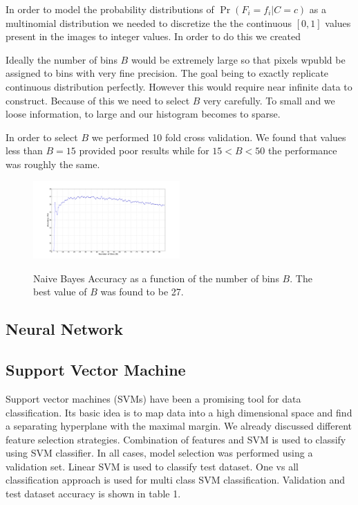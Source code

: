 \documentclass[10pt,twocolumn]{article}
\begin{document}
In order to model the probability distributions of $\Pr(F_i = f_i | C = c)$ as a multinomial distribution we needed to discretize the the continuous $[0,1]$ values present in the images to integer values. In order to do this we created

Ideally the number of bins $B$ would be extremely large so that pixels wpubld be assigned to bins with very fine precision. The goal being to exactly replicate continuous distribution perfectly. However this would require near infinite data to construct. Because of this we need to select $B$ very carefully. To small and we loose information, to large and our histogram becomes to sparse. 

In order to select $B$ we performed 10 fold cross validation. We found that values less than $B=15$ provided poor results while for $ 15 < B < 50$ the performance was roughly the same.
\begin{figure}
\includegraphics[trim=150 50 150 50,clip=true,width=0.5\textwidth]{./figure_1.png}
\label{bins}
\caption{Naive Bayes Accuracy as a function of the number of bins $B$. The best value of $B$ was found to be 27.}
\end{figure}
\subsection{Neural Network}
\subsection{Support Vector Machine}
Support vector machines (SVMs) have been a promising tool for data classification. Its basic idea is to map data into a high dimensional space and find a separating hyperplane with the maximal margin.
We already discussed different feature selection strategies\cite {chen2006combining}. Combination of features and SVM is used to classify using SVM classifier. In all cases, model selection was performed using a validation set. Linear SVM is used to classify test dataset. One vs all classification approach is used for multi class SVM classification. Validation and test dataset accuracy is shown in table 1.
\\
\end{document}
